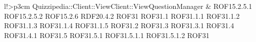 \begin{tabella}{l!{\VRule}>{\centering\arraybackslash}p{3cm}}
Quizzipedia::Client::ViewClient::ViewQuestionManager & ROF15.2.5.1 \linebreak ROF15.2.5.2 \linebreak ROF15.2.6 \linebreak RDF20.4.2 \linebreak ROF31 \linebreak ROF31.1 \linebreak ROF31.1.1 \linebreak ROF31.1.2 \linebreak ROF31.1.3 \linebreak ROF31.1.4 \linebreak ROF31.1.5 \linebreak ROF31.2 \linebreak ROF31.3 \linebreak ROF31.3.1 \linebreak ROF31.4 \linebreak ROF31.4.1 \linebreak ROF31.5 \linebreak ROF31.5.1 \linebreak ROF31.5.1.1 \linebreak ROF31.5.1.2 \linebreak ROF31
\end{tabella}
